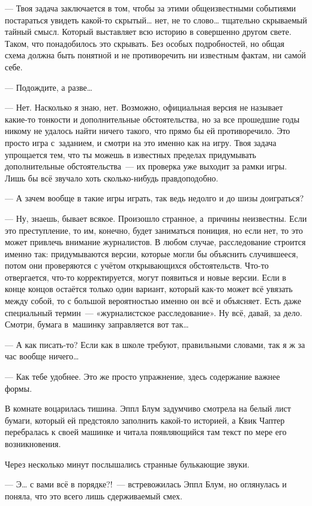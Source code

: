\documentclass[fontsize=11pt,a5paper,titlepage=firstcover]{scrbook}
\begin{document}
--- Твоя задача заключается в том, чтобы за этими общеизвестными событиями постараться увидеть какой-то скрытый{\ldots} нет, не то слово{\ldots} тщательно скрываемый тайный смысл. Который выставляет всю историю в совершенно другом свете. Таком, что понадобилось это скрывать. Без особых подробностей, но общая схема должна быть понятной и не противоречить ни известным фактам, ни сам\'ой себе.

--- Подождите, а разве{\ldots}

--- Нет. Насколько я знаю, нет. Возможно, официальная версия не называет какие-то тонкости и дополнительные обстоятельства, но за все прошедшие годы никому не удалось найти ничего такого, что прямо бы ей противоречило. Это просто игра с~заданием, и смотри на это именно как на игру. Твоя задача упрощается тем, что ты можешь в известных пределах придумывать дополнительные обстоятельства~--- их проверка уже выходит за рамки игры. Лишь бы всё звучало хоть сколько-нибудь правдоподобно.

--- А зачем вообще в такие игры играть, так ведь недолго и до шизы доиграться?

--- Ну, знаешь, бывает всякое. Произошло странное, а~причины неизвестны. Если это преступление, то им, конечно, будет заниматься пониция, но если нет, то это может привлечь внимание журналистов. В любом случае, расследование строится именно так: придумываются версии, которые могли бы объяснить случившееся, потом они проверяются с учётом открывающихся обстоятельств. Что-то отвергается, что-то корректируется, могут появиться и новые версии. Если в конце концов остаётся только один вариант, который как-то может всё увязать между собой, то с большой вероятностью именно он всё и объясняет. Есть даже специальный термин~--- «журналистское расследование». Ну всё, давай, за дело. Смотри, бумага в~машинку заправляется вот так{\ldots}

--- А как писать-то? Если как в школе требуют, правильными словами, так я ж за час вообще ничего{\ldots}

--- Как тебе удобнее. Это же просто упражнение, здесь содержание важнее формы.

В комнате воцарилась тишина. Эппл Блум задумчиво смотрела на белый лист бумаги, который ей предстояло заполнить какой-то историей, а Квик Чаптер перебралась к своей машинке и читала появляющийся там текст по мере его возникновения.

Через несколько минут послышались странные булькающие звуки.

--- Э{\ldots} с вами всё в порядке?!~--- встревожилась Эппл Блум, но оглянулась и поняла, что это всего лишь сдерживаемый смех.
\end{document}
